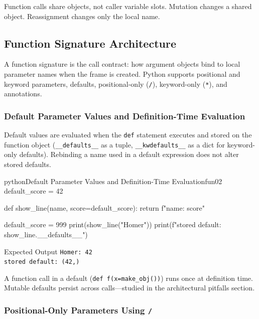 \documentclass[a4paper,twoside]{report}
\begin{document}
Function calls share objects, not caller variable slots. Mutation changes a shared object. Reassignment changes only the local name.


\subsection{Function Signature Architecture}

A function signature is the call contract: how argument objects bind to local parameter names when the frame is created. Python supports positional and keyword parameters, defaults, positional-only (\texttt{/}), keyword-only (\texttt{*}), and annotations.

\subsubsection{Default Parameter Values and Definition-Time Evaluation}

Default values are evaluated when the \texttt{def} statement executes and stored on the function object (\texttt{\_\_defaults\_\_} as a tuple, \texttt{\_\_kwdefaults\_\_} as a dict for keyword-only defaults). Rebinding a name used in a default expression does not alter stored defaults.

\begin{codebox}[]{python}{Default Parameter Values and Definition-Time Evaluation}{fun02}
default_score = 42

def show_line(name, score=default_score):
    return f"{name}: {score}"

default_score = 999
print(show_line("Homer"))
print(f"stored default: {show_line.__defaults__}")
\end{codebox}


\begin{iobox}{Expected Output}
\texttt{Homer: 42} \\
\texttt{stored default: (42,)} \\
\end{iobox}




A function call in a default (\texttt{def f(x=make\_obj())}) runs once at definition time. Mutable defaults persist across calls---studied in the architectural pitfalls section.

\subsubsection{Positional-Only Parameters Using \texttt{/}}
\end{document}
